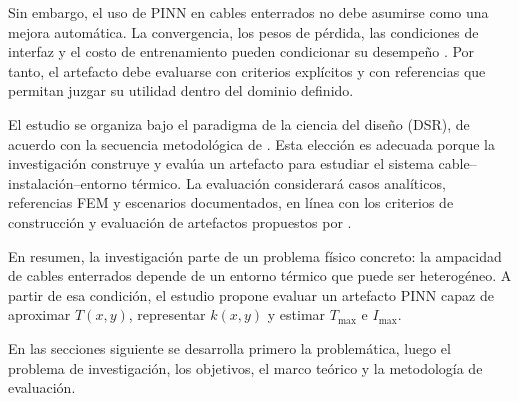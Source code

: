 \documentclass[11pt]{article}
\newcommand{\Tmax}{T_{\max}}
\newcommand{\Imax}{I_{\max}}
\newcommand{\kx}{k(x,y)}
\begin{document}
Sin embargo, el uso de PINN en cables enterrados no debe asumirse como una mejora automática. La convergencia, los pesos de pérdida, las condiciones de interfaz y el costo de entrenamiento pueden condicionar su desempeño \parencites[1--2,14--17]{lawal2022}[2--6]{ren2025}. Por tanto, el artefacto debe evaluarse con criterios explícitos y con referencias que permitan juzgar su utilidad dentro del dominio definido.

El estudio se organiza bajo el paradigma de la ciencia del diseño (DSR), de acuerdo con la secuencia metodológica de \textcite[55--56]{peffers2007}. Esta elección es adecuada porque la investigación construye y evalúa un artefacto para estudiar el sistema cable--instalación--entorno térmico. La evaluación considerará casos analíticos, referencias FEM y escenarios documentados, en línea con los criterios de construcción y evaluación de artefactos propuestos por \textcite[342--344]{gregor2013}.

En resumen, la investigación parte de un problema físico concreto: la ampacidad de cables enterrados depende de un entorno térmico que puede ser heterogéneo. A partir de esa condición, el estudio propone evaluar un artefacto PINN capaz de aproximar \(T(x,y)\), representar \(\kx\) y estimar \(\Tmax\) e \(\Imax\). 

En las  secciones siguiente se desarrolla primero la problemática, luego el problema de investigación, los objetivos, el marco teórico y la metodología de evaluación.

\printbibliography[title={Referencias}]
\end{document}
